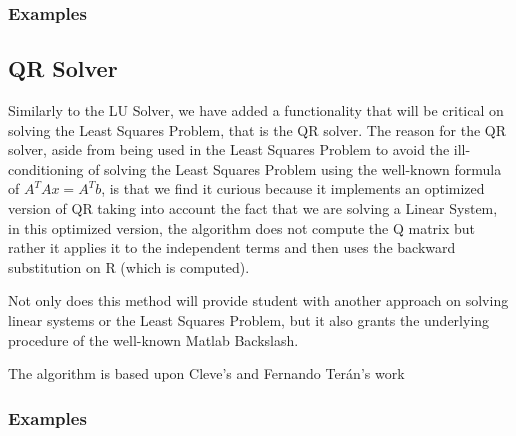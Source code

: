 \subsubsection{Examples}
	

\subsection{QR Solver}
Similarly to the LU Solver, we have added a functionality that will be critical on solving the Least Squares Problem, that is the QR solver. The reason for the QR solver, aside from being used in the Least Squares Problem to avoid the ill-conditioning of solving the Least Squares Problem using the well-known formula of $A^T A x= A^T b$, is that we find it curious because it implements an optimized version of QR taking into account the fact that we are solving a Linear System, in this optimized version, the algorithm does not compute the Q matrix but rather it applies it to the independent terms and then uses the backward substitution on R (which is computed).

Not only does this method will provide student with another approach on solving linear systems or the Least Squares Problem, but it also grants the underlying procedure of the well-known Matlab Backslash.

The algorithm is based upon Cleve's and Fernando Terán's work \cite{Vergara,doi:10.1137/1.9780898717952}
\subsubsection{Examples}



